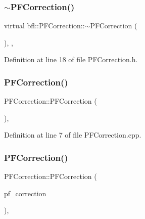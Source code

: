 \subsubsection{\texorpdfstring{$\sim$\+P\+F\+Correction()}{~PFCorrection()}}
{\footnotesize\ttfamily virtual bfl\+::\+P\+F\+Correction\+::$\sim$\+P\+F\+Correction (\begin{DoxyParamCaption}{ }\end{DoxyParamCaption})\hspace{0.3cm}{\ttfamily [inline]}, {\ttfamily [virtual]}, {\ttfamily [noexcept]}}



Definition at line 18 of file P\+F\+Correction.\+h.

\mbox{\label{classbfl_1_1PFCorrection_ae4be8c44771f209d79c549305cb63dcf}} 
\subsubsection{\texorpdfstring{P\+F\+Correction()}{PFCorrection()}\hspace{0.1cm}{\footnotesize\ttfamily [1/2]}}
{\footnotesize\ttfamily P\+F\+Correction\+::\+P\+F\+Correction (\begin{DoxyParamCaption}{ }\end{DoxyParamCaption})\hspace{0.3cm}{\ttfamily [protected]}, {\ttfamily [noexcept]}}



Definition at line 7 of file P\+F\+Correction.\+cpp.

\mbox{\label{classbfl_1_1PFCorrection_a95a379a1b622c782020bdd06c59cca3f}} 
\subsubsection{\texorpdfstring{P\+F\+Correction()}{PFCorrection()}\hspace{0.1cm}{\footnotesize\ttfamily [2/2]}}
{\footnotesize\ttfamily P\+F\+Correction\+::\+P\+F\+Correction (\begin{DoxyParamCaption}\item[{\mbox{\hyperlink{classbfl_1_1PFCorrection}{P\+F\+Correction}} \&\&}]{pf\+\_\+correction }\end{DoxyParamCaption})\hspace{0.3cm}{\ttfamily [protected]}, {\ttfamily [noexcept]}}



